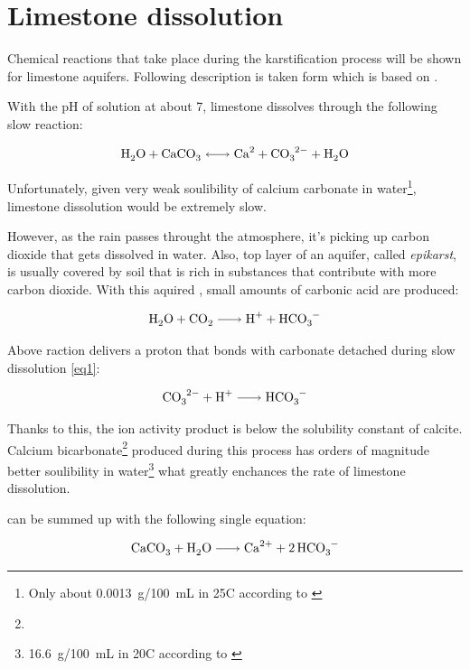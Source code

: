 \section{Limestone dissolution}

Chemical reactions that take place during the karstification process will be
shown for limestone aquifers. Following description is taken form \cite{dreybrodt2002}
which is based on \cite{plummer1978}.

With the pH of solution at about 7, limestone dissolves through the following
slow reaction:

\begin{equation}
  \cee{H2O + CaCO3 <-> Ca^2 + CO3^2- + H2O}
  \label{eq1}
\end{equation}

Unfortunately, given very weak soulibility of calcium carbonate in water\footnote{Only about 0.0013~g/100~mL in 25\degree C according to \cite{aylward2008si}},
limestone dissolution would be extremely slow.

However, as the rain passes throught the atmosphere, it's picking up carbon
dioxide that gets dissolved in water. Also, top layer of an aquifer, called
\emph{epikarst}, is usually covered by soil that is rich in substances that
contribute with more carbon dioxide. With this aquired , small amounts
of carbonic acid are produced:

\begin{equation}
  \cee{H2O + CO2 -> H^+ + HCO3^-}
  \label{eq2}
\end{equation}

Above raction delivers a proton that bonds with carbonate detached during slow
dissolution \ref{eq1}:

\begin{equation}
  \ce{CO3^2- + H^+ -> HCO3^-}
  \label{eq3}
\end{equation}

Thanks to this, the ion activity product   is below the
solubility constant of calcite. Calcium bicarbonate\footnote{} produced
during this process has orders of magnitude better soulibility in water\footnote{16.6~g/100~mL in 20\degree C according to \cite{aylward2008si}}
what greatly enchances the rate of limestone dissolution.

 can be summed up with the following single
equation:

\begin{equation}
  \ce{CaCO3 + H2O -> Ca^2+ + 2HCO3^- }
  \label{eq4}
\end{equation}

